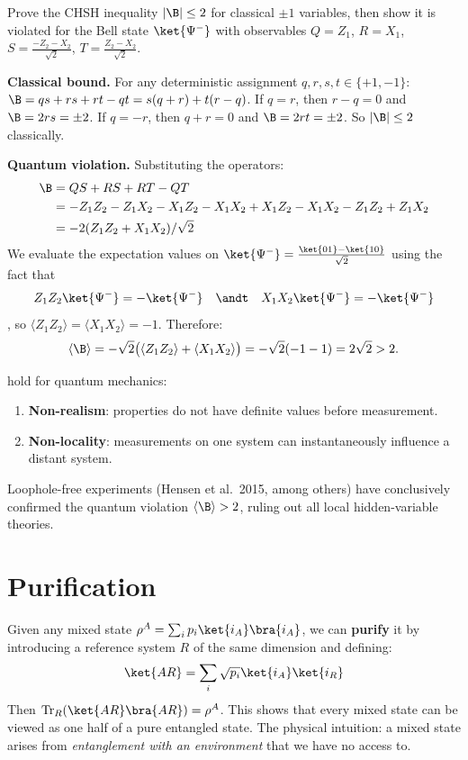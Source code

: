 \documentclass[oneside]{academica}
\begin{document}
\begin{exercise*}
  Prove the CHSH inequality $|\B|\le2$ for classical $\pm1$ variables, then show it is violated for the Bell state $\ket{\Psi^-}$ with observables $Q=Z_1$, $R=X_1$, $S=\tfrac{-Z_2-X_2}{\sqrt{2}}$, $T=\tfrac{Z_2-X_2}{\sqrt{2}}$.

  \textbf{Classical bound.}
  For any deterministic assignment $q,r,s,t\in\{+1,-1\}$:
  $\B=qs+rs+rt-qt=s(q+r)+t(r-q)$.
  If $q=r$, then $r-q=0$ and $\B=2rs=\pm2$.
  If $q=-r$, then $q+r=0$ and $\B=2rt=\pm2$.
  So $|\B|\le2$ classically.

  \textbf{Quantum violation.}
  Substituting the operators:
  \begin{align*}
    \B &= QS+RS+RT-QT \\
       &= -Z_1Z_2 - Z_1X_2 - X_1Z_2 - X_1X_2 + X_1Z_2 - X_1X_2 - Z_1Z_2 + Z_1X_2 \\
       &= -2(Z_1Z_2+X_1X_2)/\sqrt{2}
  \end{align*}
  We evaluate the expectation values on $\ket{\Psi^-}=\tfrac{\ket{01}-\ket{10}}{\sqrt{2}}$ using the fact that
  \begin{equation*}
    Z_1Z_2\ket{\Psi^-}=-\ket{\Psi^-} \quad \andt \quad X_1X_2\ket{\Psi^-}=-\ket{\Psi^-}
  \end{equation*}
  , so $\langle Z_1Z_2\rangle=\langle X_1X_2\rangle=-1$.
  Therefore:
  \begin{equation*}
    \langle\B\rangle = -\sqrt{2}\bigl(\langle Z_1Z_2\rangle+\langle X_1X_2\rangle\bigr) = -\sqrt{2}(-1-1) = 2\sqrt{2} > 2.
  \end{equation*}
\end{exercise*}
hold for quantum mechanics:
\begin{enumerate}
  \item \textbf{Non-realism}: properties do not have definite values before measurement.
  \item \textbf{Non-locality}: measurements on one system can instantaneously influence a distant system.
\end{enumerate}
Loophole-free experiments (Hensen et al.\ 2015, among others) have conclusively confirmed the quantum violation $\langle\B\rangle>2$, ruling out all local hidden-variable theories.

\section{Purification}

Given any mixed state $\rho^A=\sum_i p_i\ket{i_A}\bra{i_A}$, we can \textbf{purify} it by introducing a reference system $R$ of the same dimension and defining:
\begin{equation*}
  \ket{AR}=\sum_i\sqrt{p_i}\ket{i_A}\ket{i_R}
\end{equation*}
Then $\tr_R(\ket{AR}\bra{AR})=\rho^A$.
This shows that every mixed state can be viewed as one half of a pure entangled state.
The physical intuition: a mixed state arises from \emph{entanglement with an environment} that we have no access to.
\end{document}
